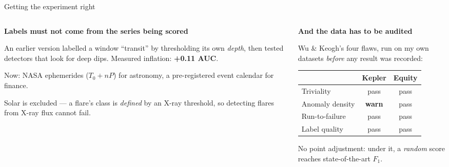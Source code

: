 \documentclass[aspectratio=169,10pt]{beamer}
\newcommand{\hl}[1]{\textcolor{hl}{\textbf{#1}}}
\begin{document}
\begin{frame}{Getting the experiment right}
  \begin{columns}[T]
    \begin{column}{0.48\textwidth}
      \textbf{Labels must not come from the series being scored}

      \vspace{0.4em}
      \small
      An earlier version labelled a window ``transit'' by thresholding its own
      \emph{depth}, then tested detectors that look for deep dips.
      Measured inflation: \hl{+0.11 AUC}.

      \vspace{0.6em}
      Now: NASA ephemerides ($T_0 + nP$) for astronomy, a pre-registered event
      calendar for finance.

      \vspace{0.6em}
      Solar is excluded --- a flare's class is \emph{defined} by an X-ray
      threshold, so detecting flares from X-ray flux cannot fail.
    \end{column}
    \begin{column}{0.48\textwidth}
      \textbf{And the data has to be audited}

      \vspace{0.4em}
      \small
      Wu \& Keogh's four flaws, run on my own datasets \emph{before} any
      result was recorded:

      \vspace{0.5em}
      \begin{tabular}{@{}lcc@{}}
        \toprule
        & Kepler & Equity \\
        \midrule
        Triviality        & pass & pass \\
        Anomaly density   & \hl{warn} & pass \\
        Run-to-failure    & pass & pass \\
        Label quality     & pass & pass \\
        \bottomrule
      \end{tabular}

      \vspace{0.6em}
      No point adjustment: under it, a \emph{random} score reaches
      state-of-the-art $F_1$.
    \end{column}
  \end{columns}
\end{frame}
\end{document}
